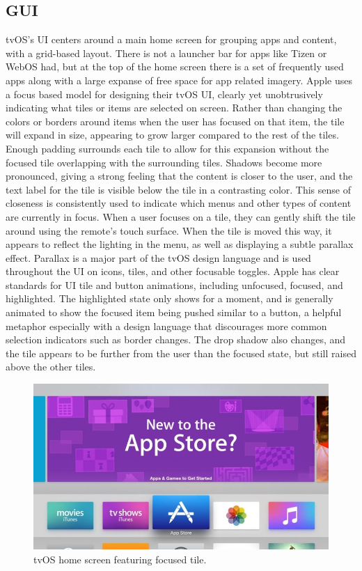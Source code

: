\documentclass[12pt, letterpaper]{article}
\begin{document}
\subsection{GUI}
tvOS's UI centers around a main home screen for grouping apps and content, with a grid-based layout. There is not a launcher bar for apps like Tizen or WebOS had, but at the top of the home screen there is a set of frequently used apps along with a large expanse of free space for app related imagery. Apple uses a focus based model for designing their tvOS UI, clearly yet unobtrusively indicating what tiles or items are selected on screen.  Rather than changing the colors or borders around items when the user has focused on that item, the tile will expand in size, appearing to grow larger compared to the rest of the tiles.  Enough padding surrounds each tile to allow for this expansion without the focused tile
overlapping with the surrounding tiles.  Shadows become more pronounced, giving a strong feeling that the content is closer to the user, and the text label for the tile is visible below the tile in a contrasting color.  This sense of closeness is consistently used to indicate which menus and other types of content are currently in focus. When a user focuses on a tile, they can gently shift the tile around using the remote's touch surface.  When the tile is moved this way, it appears to reflect the lighting in the menu, as well as displaying a subtle parallax effect.  Parallax is a major part of the tvOS design language and is used throughout the UI on icons, tiles, and other focusable toggles. Apple has clear standards for 
UI tile and button animations, including unfocused, focused, and highlighted. The highlighted state only shows for a moment, and is generally animated to show the focused item being pushed similar to a button, a helpful metaphor especially with a design language that discourages more common selection indicators such as border changes.  The drop shadow also changes, and the tile appears to be further from the user than the focused state, but still raised above the other tiles\cite{designing_for_apple_tv}.  
\begin{figure}
    \includegraphics[width=\textwidth]{tvos_home_screen.jpg}
    \caption{tvOS home screen featuring focused tile.}
\end{figure}
\end{document}
